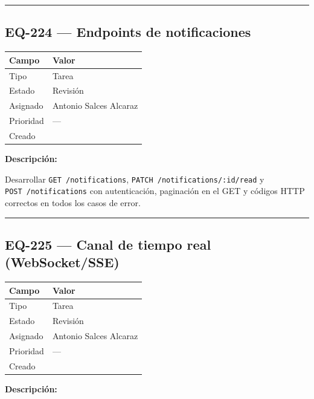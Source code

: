 \documentclass[
  spanish,
  11pt,
]{report}
\newcounter{none} %
\begin{document}
\begin{center}\rule{0.5\linewidth}{0.5pt}\end{center}

\subsection{EQ-224 --- Endpoints de
notificaciones}\label{eq-224-endpoints-de-notificaciones}

{\def\LTcaptype{none} %
\begin{longtable}[]{@{}ll@{}}
\toprule\noalign{}
Campo & Valor \\
\midrule\noalign{}
\endhead
\bottomrule\noalign{}
\endlastfoot
Tipo & Tarea \\
Estado & Revisión \\
Asignado & Antonio Salces Alcaraz \\
Prioridad & --- \\
Creado & \\
\end{longtable}
}

\textbf{Descripción:}

Desarrollar \texttt{GET\ /notifications},
\texttt{PATCH\ /notifications/:id/read} y \texttt{POST\ /notifications}
con autenticación, paginación en el GET y códigos HTTP correctos en
todos los casos de error.

\begin{center}\rule{0.5\linewidth}{0.5pt}\end{center}

\subsection{EQ-225 --- Canal de tiempo real
(WebSocket/SSE)}\label{eq-225-canal-de-tiempo-real-websocketsse}

{\def\LTcaptype{none} %
\begin{longtable}[]{@{}ll@{}}
\toprule\noalign{}
Campo & Valor \\
\midrule\noalign{}
\endhead
\bottomrule\noalign{}
\endlastfoot
Tipo & Tarea \\
Estado & Revisión \\
Asignado & Antonio Salces Alcaraz \\
Prioridad & --- \\
Creado & \\
\end{longtable}
}

\textbf{Descripción:}
\end{document}
